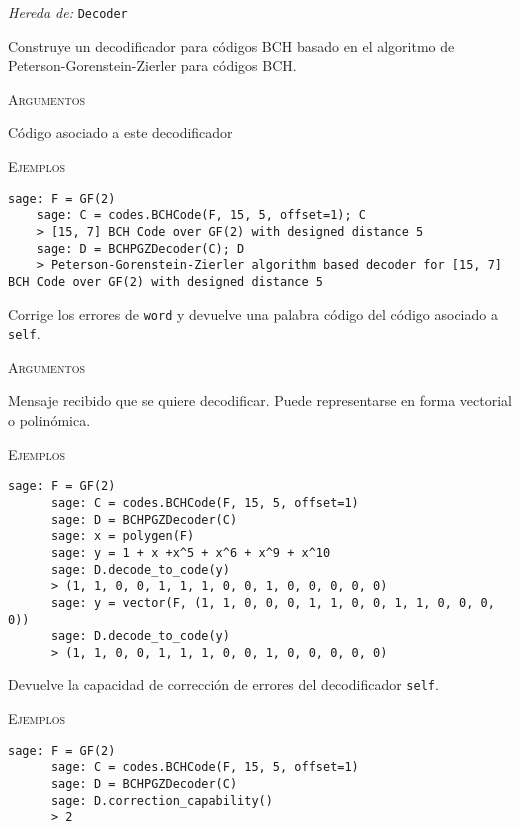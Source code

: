 \begin{description}[leftmargin=1em, font=\normalfont\ttfamily, style=nextline]
  \item[class BCHPGZDecoder(self, code)]
  
  \emph{Hereda de:} \texttt{Decoder}

  Construye un decodificador para códigos BCH basado en el algoritmo de Peterson-Gorenstein-Zierler para códigos BCH.

  \textsc{Argumentos}
  \begin{description}[font=\normalfont\ttfamily]
    \item[code] Código asociado a este decodificador
  \end{description}

  \textsc{Ejemplos}
  \begin{lstlisting}[gobble=4]
    sage: F = GF(2)
    sage: C = codes.BCHCode(F, 15, 5, offset=1); C
    > [15, 7] BCH Code over GF(2) with designed distance 5
    sage: D = BCHPGZDecoder(C); D
    > Peterson-Gorenstein-Zierler algorithm based decoder for [15, 7] BCH Code over GF(2) with designed distance 5
  \end{lstlisting}

  \begin{description}[font=\ttfamily, style=nextline]
    \item[decode\_to\_code(self, word)] Corrige los errores de \texttt{word} y devuelve una palabra código del código asociado a \texttt{self}.
    
    \textsc{Argumentos}
    \begin{description}[font=\normalfont\ttfamily]
      \item[word] Mensaje recibido que se quiere decodificar. 
      Puede representarse en forma vectorial o polinómica.
    \end{description}
    
    \textsc{Ejemplos}
    \begin{lstlisting}[gobble=6]
      sage: F = GF(2)
      sage: C = codes.BCHCode(F, 15, 5, offset=1)
      sage: D = BCHPGZDecoder(C)
      sage: x = polygen(F)
      sage: y = 1 + x +x^5 + x^6 + x^9 + x^10
      sage: D.decode_to_code(y)
      > (1, 1, 0, 0, 1, 1, 1, 0, 0, 1, 0, 0, 0, 0, 0)
      sage: y = vector(F, (1, 1, 0, 0, 0, 1, 1, 0, 0, 1, 1, 0, 0, 0, 0))
      sage: D.decode_to_code(y)
      > (1, 1, 0, 0, 1, 1, 1, 0, 0, 1, 0, 0, 0, 0, 0)
    \end{lstlisting}

    \item[correction\_capability(self)] Devuelve la capacidad de corrección de errores del decodificador \texttt{self}.
    
    \textsc{Ejemplos}
    \begin{lstlisting}[gobble=6]
      sage: F = GF(2)
      sage: C = codes.BCHCode(F, 15, 5, offset=1)
      sage: D = BCHPGZDecoder(C)
      sage: D.correction_capability()
      > 2
    \end{lstlisting}
  \end{description}
\end{description}

